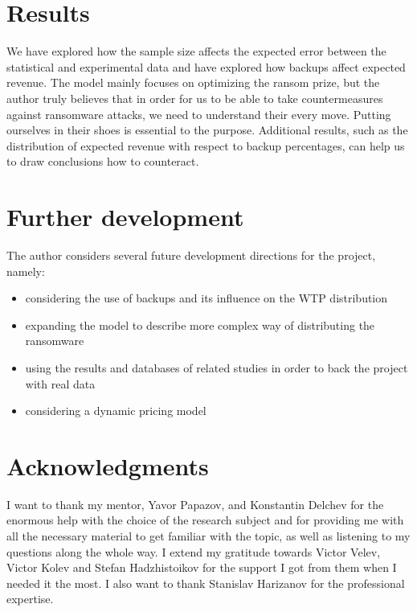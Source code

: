 \documentclass[11pt, a4paper]{article}
\theoremstyle{definition}
\begin{document}
\section{Results}
	We have explored how the sample size affects the expected error between the statistical and experimental data and have explored how backups affect expected revenue. The model mainly focuses on optimizing the ransom prize, but the author truly believes that in order for us to be able to take countermeasures against ransomware attacks, we need to understand their every move. Putting ourselves in their shoes is essential to the purpose. Additional results, such as the distribution of expected revenue with respect to backup percentages, can help us to draw conclusions how to counteract.
\section{Further development}
	The author considers several future development directions for the project, namely:
	\begin{itemize}
		\item considering the use of backups and its influence on the WTP distribution
		\item expanding the model to describe more complex way of distributing the ransomware
		\item using the results and databases of related studies in order to back the project with real data\cite{paquet2019ransomware}
		\item considering a dynamic pricing model
	\end{itemize}
\section{Acknowledgments}
I want to thank my mentor, Yavor Papazov, and Konstantin Delchev for the enormous help with the choice of the research subject and for providing me with all the necessary material to get familiar with the topic, as well as listening to my questions along the whole way. I extend my gratitude towards Victor Velev, Victor Kolev and Stefan Hadzhistoikov for the support I got from them when I needed it the most. I also want to thank Stanislav Harizanov for the professional expertise.
\nocite{*}


\end{document}

